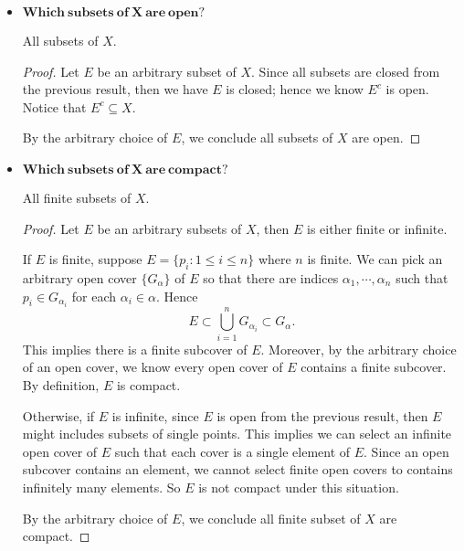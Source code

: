 \begin{Exercise}
\begin{itemize}
\begin{proof}
			Pick $r = \frac{1}{2}$, then the neighborhood $N_r(p)$ only contains $p$ itself, then $p\notin E'$. By the arbitrary choice of $p$, then $E' = \emptyset$. This implies that $E'\subseteq E$ vacuously, so $E$ is closed.
			
			By the arbitrary choice of $E$, we conclude all subsets of $X$ are closed.
		\end{proof}
		
		\item $\mathbf{Which\ subsets\ of\ X\ are\ open?}$
		\begin{answer}
			All subsets of $X$.
		\end{answer}
		\begin{proof}
			Let $E$ be an arbitrary subset of $X$. Since all subsets are closed from the previous result, then we have $E$ is closed; hence we know $E^c$ is open. Notice that $E^c \subseteq X$.
			
			By the arbitrary choice of $E$, we conclude all subsets of $X$ are open. 
		\end{proof}
		
		\item $\mathbf{Which\ subsets\ of\ X\ are\ compact?}$
		\begin{answer}
			All finite subsets of $X$.
		\end{answer}
		\begin{proof}
			Let $E$ be an arbitrary subsets of $X$, then $E$ is either finite or infinite.
			
			If $E$ is finite, suppose $E = \{p_i: 1\leq i\leq n\}$ where $n$ is finite. We can pick an arbitrary open cover $\{G_{\alpha}\}$ of $E$ so that there are indices $\alpha_{1}, \cdots, \alpha_{n}$ such that $p_i\in G_{\alpha_i}$ for each $\alpha_i\in \alpha$. Hence
			$$
			E \subset \bigcup_{i=1}^{n}G_{\alpha_i} \subset G_{\alpha}.
			$$
			This implies there is a finite subcover of $E$. Moreover, by the arbitrary choice of an open cover, we know every open cover of $E$ contains a finite subcover. By definition, $E$ is compact.
			
			Otherwise, if $E$ is infinite, since $E$ is open from the previous result, then $E$ might includes subsets of single points. This implies we can select an infinite open cover of $E$ such that each cover is a single element of $E$. Since an open subcover contains an element, we cannot select finite open covers to contains infinitely many elements. So $E$ is not compact under this situation.
			
			By the arbitrary choice of $E$, we conclude all finite subset of $X$ are compact.
		\end{proof}
	\end{itemize}
\end{Exercise}